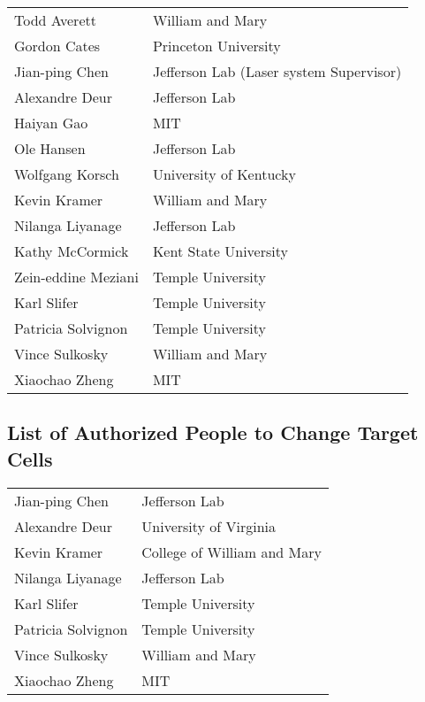 \begin{tabular}{ll}
Todd Averett		& William and Mary \\
Gordon Cates            & Princeton University \\
Jian-ping Chen          & Jefferson Lab (Laser system Supervisor) \\
Alexandre Deur          & Jefferson Lab \\
Haiyan Gao              & MIT \\
Ole Hansen              & Jefferson Lab \\
Wolfgang Korsch         & University of Kentucky \\
Kevin Kramer            & William and Mary \\
Nilanga Liyanage        & Jefferson Lab \\
Kathy McCormick         & Kent State University \\
Zein-eddine Meziani     & Temple University \\
Karl Slifer             & Temple University \\
Patricia Solvignon	& Temple University \\
Vince Sulkosky          & William and Mary \\
Xiaochao Zheng          & MIT \\
\end{tabular}

\subsection{List of Authorized People to Change Target Cells}

\begin{tabular}{ll}
Jian-ping Chen          & Jefferson Lab \\
Alexandre Deur          & University of Virginia\\
Kevin Kramer            & College of William and Mary \\
Nilanga Liyanage        & Jefferson Lab \\
Karl Slifer             & Temple University \\
Patricia Solvignon	& Temple University \\
Vince Sulkosky          & William and Mary \\
Xiaochao Zheng          & MIT \\
\end{tabular}



